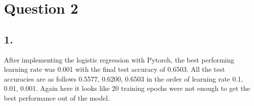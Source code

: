 \documentclass[11pt]{article}
\begin{document}
\clearpage

\section{Question 2}
\subsection{1.}
After implementing the logistic regression with Pytorch, the best performing learning rate was 0.001 with the final test accuracy of 0.6503.
All the test accuracies are as follows 0.5577, 0.6200, 0.6503 in the order of learning rate 0.1, 0.01, 0.001.
Again here it looks like 20 training epochs were not enough to get the best performance out of the model.
\end{document}

